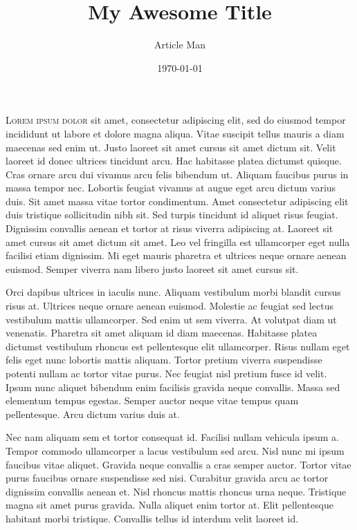 \documentclass[a4paper,12pt,oneside]{article}
\title{My Awesome Title}
\author{Article Man}
\date{\today}
\makeatletter
\newcommand{\subtitle}{A nice and simple subtitle to the article}
\def\maketitle{\noindent{
\vspace{0.25in}
    \begin{center}
        {\fontsize{30}{36}\selectfont\sffamily\AlegreyaSansExtraBold\MakeLowercase\@title}\\\vspace{1.2em}%
        {\textit{\subtitle}\vspace{1.5em}}\\%
        {\small{\@author\ |\ \@date}}\vspace{1.5em}%
    \end{center}
  }
}
\makeatother
\begin{document}
\maketitle

\lettrine[lines=3,nindent=0em]{L}{orem ipsum dolor} sit amet, consectetur adipiscing elit, sed do eiusmod tempor incididunt ut labore et dolore magna aliqua. Vitae suscipit tellus mauris a diam maecenas sed enim ut. Justo laoreet sit amet cursus sit amet dictum sit. Velit laoreet id donec ultrices tincidunt arcu. Hac habitasse platea dictumst quisque. Cras ornare arcu dui vivamus arcu felis bibendum ut. Aliquam faucibus purus in massa tempor nec. Lobortis feugiat vivamus at augue eget arcu dictum varius duis. Sit amet massa vitae tortor condimentum. Amet consectetur adipiscing elit duis tristique sollicitudin nibh sit. Sed turpis tincidunt id aliquet risus feugiat. Dignissim convallis aenean et tortor at risus viverra adipiscing at. Laoreet sit amet cursus sit amet dictum sit amet. Leo vel fringilla est ullamcorper eget nulla facilisi etiam dignissim. Mi eget mauris pharetra et ultrices neque ornare aenean euismod. Semper viverra nam libero justo laoreet sit amet cursus sit.

Orci dapibus ultrices in iaculis nunc. Aliquam vestibulum morbi blandit cursus risus at. Ultrices neque ornare aenean euismod. Molestie ac feugiat sed lectus vestibulum mattis ullamcorper. Sed enim ut sem viverra. At volutpat diam ut venenatis. Pharetra sit amet aliquam id diam maecenas. Habitasse platea dictumst vestibulum rhoncus est pellentesque elit ullamcorper. Risus nullam eget felis eget nunc lobortis mattis aliquam. Tortor pretium viverra suspendisse potenti nullam ac tortor vitae purus. Nec feugiat nisl pretium fusce id velit. Ipsum nunc aliquet bibendum enim facilisis gravida neque convallis. Massa sed elementum tempus egestas. Semper auctor neque vitae tempus quam pellentesque. Arcu dictum varius duis at.

Nec nam aliquam sem et tortor consequat id. Facilisi nullam vehicula ipsum a. Tempor commodo ullamcorper a lacus vestibulum sed arcu. Nisl nunc mi ipsum faucibus vitae aliquet. Gravida neque convallis a cras semper auctor. Tortor vitae purus faucibus ornare suspendisse sed nisi. Curabitur gravida arcu ac tortor dignissim convallis aenean et. Nisl rhoncus mattis rhoncus urna neque. Tristique magna sit amet purus gravida. Nulla aliquet enim tortor at. Elit pellentesque habitant morbi tristique. Convallis tellus id interdum velit laoreet id.
\end{document}
